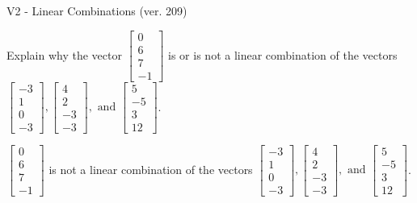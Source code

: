 \begin{exercise}
  \begin{exerciseTitle}V2 - Linear Combinations (ver. 209)\end{exerciseTitle}
  \begin{exerciseStatement}
    Explain why the vector \(\left[\begin{array}{c}
0 \\
6 \\
7 \\
-1
\end{array}\right]\)  is or is not a linear 
	combination of the vectors \(\left[\begin{array}{c}
-3 \\
1 \\
0 \\
-3
\end{array}\right] , \left[\begin{array}{c}
4 \\
2 \\
-3 \\
-3
\end{array}\right] , \text{ and } \left[\begin{array}{c}
5 \\
-5 \\
3 \\
12
\end{array}\right]\).
	


  \end{exerciseStatement}
  \begin{exerciseAnswer}
   \(\left[\begin{array}{c}
0 \\
6 \\
7 \\
-1
\end{array}\right]\) 
  	 is not  
	a linear combination of the vectors \(\left[\begin{array}{c}
-3 \\
1 \\
0 \\
-3
\end{array}\right] , \left[\begin{array}{c}
4 \\
2 \\
-3 \\
-3
\end{array}\right] , \text{ and } \left[\begin{array}{c}
5 \\
-5 \\
3 \\
12
\end{array}\right]\).

	
  


  \end{exerciseAnswer}
\end{exercise}